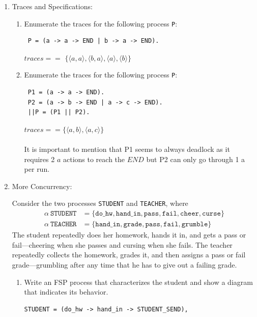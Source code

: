 \documentclass{article}
\begin{document}

\begin{enumerate}

\item Traces and Specifications:

\begin{enumerate}
\item Enumerate the traces for the following process \verb"P":
\begin{verbatim}
 P = (a -> a -> END | b -> a -> END).
\end{verbatim}
$traces == $
$ \{ \langle a, a \rangle, \langle b, a \rangle, \langle a \rangle, \langle b \rangle \} $ \\

\item Enumerate the traces for the following process \verb"P":
\begin{verbatim}
 P1 = (a -> a -> END).
 P2 = (a -> b -> END | a -> c -> END).
 ||P = (P1 || P2).
\end{verbatim}
$traces ==  \{ \langle a, b \rangle, \langle a,c \rangle \} $ \\
\\
It is important to mention that P1 seems to always deadlock as it requires 2 $a$ actions to reach the $END$ but P2 can only go through 1 a per run. \\
\end{enumerate}

\item More Concurrency:

Consider the two processes \texttt{STUDENT} and \texttt{TEACHER}, where
\begin{align*}
    \alpha\ \mathtt{STUDENT} &= \{\mathtt{do\_hw}, \mathtt{hand\_in}, \mathtt{pass}, \mathtt{fail}, \mathtt{cheer}, \mathtt{curse}\} \\
    \alpha\ \mathtt{TEACHER} &= \{\mathtt{hand\_in}, \mathtt{grade}, \mathtt{pass}, \mathtt{fail}, \mathtt{grumble}\}
\end{align*}
The student repeatedly does her homework, hands it in, and gets a pass or fail---cheering when she
passes and cursing when she fails. The teacher repeatedly collects the homework, grades it, and then assigns a pass or
fail grade---grumbling after any time that he has to give out a failing grade.

\begin{enumerate}
\item Write an FSP process that characterizes the student and show a diagram that indicates its
  behavior. \\
\begin{verbatim}
STUDENT = (do_hw -> hand_in -> STUDENT_SEND),


\end{verbatim}
\end{enumerate}
\end{enumerate}
\end{document}
